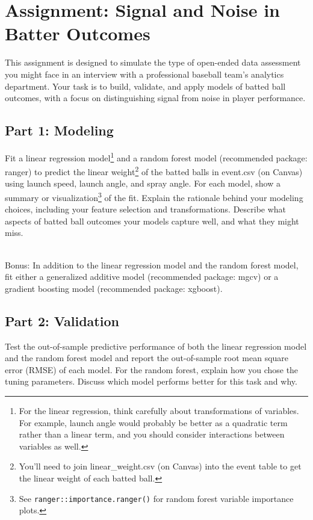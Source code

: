 \documentclass{article}
\begin{document}
  \section*{\sc Assignment: Signal and Noise in Batter Outcomes}

    This assignment is designed to simulate the type of open-ended data assessment you might face in an interview with a professional baseball team's analytics department. Your task is to build, validate, and apply models of batted ball outcomes, with a focus on distinguishing signal from noise in player performance.

    \subsection*{\sc Part 1: Modeling}

      Fit a linear regression model\footnote{For the linear regression, think carefully about transformations of variables. For example, launch angle would probably be better as a quadratic term rather than a linear term, and you should consider interactions between variables as well.} and a random forest model (recommended package: ranger) to predict the linear weight\footnote{You'll need to join linear\_weight.csv (on Canvas) into the event table to get the linear weight of each batted ball.} of the batted balls in event.csv (on Canvas) using launch speed, launch angle, and spray angle. For each model, show a summary or visualization\footnote{See \texttt{ranger::importance.ranger()} for random forest variable importance plots.} of the fit. Explain the rationale behind your modeling choices, including your feature selection and transformations. Describe what aspects of batted ball outcomes your models capture well, and what they might miss.

      ~\\
      {\sc Bonus:} In addition to the linear regression model and the random forest model, fit either a generalized additive model (recommended package: mgcv) or a gradient boosting model (recommended package: xgboost).

    \subsection*{\sc Part 2: Validation}

      Test the out-of-sample predictive performance of both the linear regression model and the random forest model and report the out-of-sample root mean square error (RMSE) of each model. For the random forest, explain how you chose the tuning parameters. Discuss which model performs better for this task and why.
\end{document}
